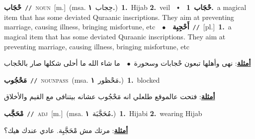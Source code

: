 \documentclass[10pt,a4paper,twoside]{article} %
\begin{document}
\begin{multicols}{2}
{{{{{{{{{{{\setlength\topsep{0pt}\textbf{\foreignlanguage{arabic}{حْجَاب}}\ {\color{gray}\texttt{//}\color{black}}\ \textsc{noun}\ [m.]\ \color{gray}(msa. \foreignlanguage{arabic}{حِجاب}~\foreignlanguage{arabic}{\textbf{١.}})\color{black}\ \textbf{1.}~Hijab  \textbf{2.}~veil\ \ $\smblkdiamond$\ \ \setlength\topsep{0pt}\textbf{\foreignlanguage{arabic}{حْجَاب}}\ \textbf{1.}~a magical item that has some deviated Quraanic inscriptions. They aim at preventing marriage, causing illness, bringing misfortune, etc\ \ $\bullet$\ \ \setlength\topsep{0pt}\textbf{\foreignlanguage{arabic}{أَحْجِبِة}}\ {\color{gray}\texttt{//}\color{black}}\ [pl.]\ \textbf{1.}~a magical item that has some deviated Quraanic inscriptions. They aim at preventing marriage, causing illness, bringing misfortune, etc\  \begin{flushright}\color{gray}\foreignlanguage{arabic}{\textbf{\underline{\foreignlanguage{arabic}{أمثلة}}}: نهى وأهلها تبعون حْجابات وسحورة\ $\bullet$\ \  ما شاء الله ما أحلى شكلها صار بالحْجاب}\end{flushright}\color{black}} \vspace{2mm}

{\setlength\topsep{0pt}\textbf{\foreignlanguage{arabic}{مَحْجُوب}}\ {\color{gray}\texttt{//}\color{black}}\ \textsc{noun\textunderscore pass}\ \color{gray}(msa. \foreignlanguage{arabic}{مَحْظور}~\foreignlanguage{arabic}{\textbf{١.}})\color{black}\ \textbf{1.}~blocked\  \begin{flushright}\color{gray}\foreignlanguage{arabic}{\textbf{\underline{\foreignlanguage{arabic}{أمثلة}}}: فتحت عالموقع طلعلي انه مَحْجُوب عشانه بيتنافى مع القيم والأخلاق}\end{flushright}\color{black}} \vspace{2mm}

{\setlength\topsep{0pt}\textbf{\foreignlanguage{arabic}{مْحَجَّب}}\ {\color{gray}\texttt{//}\color{black}}\ \textsc{adj}\ [m.]\ \color{gray}(msa. \foreignlanguage{arabic}{مُحَجَّبَة}~\foreignlanguage{arabic}{\textbf{١.}})\color{black}\ \textbf{1.}~Hijabi  \textbf{2.}~wearing Hijab\  \begin{flushright}\color{gray}\foreignlanguage{arabic}{\textbf{\underline{\foreignlanguage{arabic}{أمثلة}}}: مرتك مش مْحَجَّبِة. عادي عندك هيك؟}\end{flushright}\color{black}} \vspace{2mm}

}}}}}}}}}}
\end{multicols}
\end{document}
